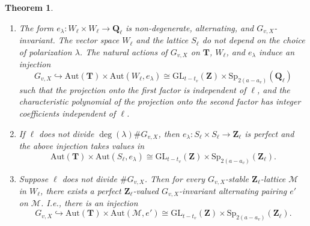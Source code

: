 \documentclass{amsart}
\def\Q{{\mathbf Q}}
\def\Z{{\mathbf Z}}
\def\Aut{\mathrm{Aut}}
\def\GL{\mathrm{GL}}
\def\Sp{\mathrm{Sp}}
\def\M{\mathcal{M}}
\def\T{{\mathbf T}}
\newtheorem{thm}{Theorem}[section]
\theoremstyle{definition}
\begin{document}
\begin{thm}
\label{hd}
\begin{enumerate}
\item[(i)] The form $e_\lambda: W_{\ell} \times W_{\ell} \to \Q_\ell$ is 
non-degenerate, alternating, and $G_{v,X}$-invariant.
The vector space $W_{\ell}$ and the lattice $S_{\ell}$ 
do not depend on the choice of 
polarization $\lambda$. 
The natural actions of $G_{v,X}$ on $\T$, 
$W_{\ell}$, and $e_\lambda$ induce an injection
$$G_{v,X} \hookrightarrow 
\Aut(\T) \times \Aut(W_{\ell},e_{\lambda}) \cong 
\GL_{t-t_{v}}(\Z) \times \Sp_{2(a-a_{v})}(\Q_{\ell})$$
such that 
the projection onto the first factor is independent of $\ell$,
and the characteristic polynomial of the projection onto the
second factor has integer coefficients independent of $\ell$.
\item[(ii)] 
If 
$\ell$ does not divide $\deg(\lambda)\#G_{v,X}$, then 
$e_\lambda: S_{\ell} \times S_{\ell} \to \Z_\ell$ is perfect and
the above injection takes values in 
$$\Aut(\T) \times \Aut(S_{\ell},e_{\lambda}) \cong 
\GL_{t-t_{v}}(\Z) \times \Sp_{2(a-a_{v})}(\Z_{\ell}).$$
\item[(iii)] 
Suppose $\ell$ does not divide $\#G_{v,X}$. Then 
for every $G_{v,X}$-stable $\Z_{\ell}$-lattice $\M$ in $W_{\ell}$, 
 there exists
 a perfect $\Z_{\ell}$-valued $G_{v,X}$-invariant alternating
pairing $e'$ on $\M$. I.e., there is an injection
$$G_{v,X} \hookrightarrow 
\Aut(\T) \times \Aut(\M,e') \cong 
\GL_{t-t_{v}}(\Z) \times \Sp_{2(a-a_{v})}(\Z_{\ell}).$$
\end{enumerate}
\end{thm}
\end{document}
